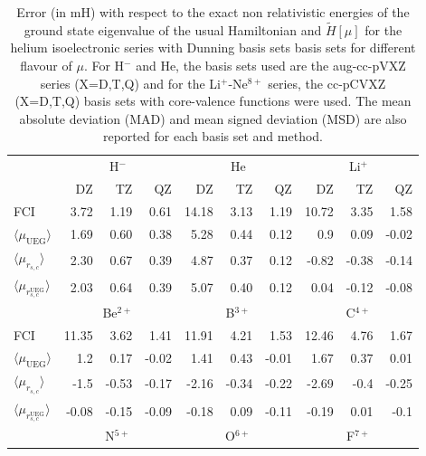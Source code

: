 \documentclass[aip,jcp,reprint,noshowkeys,superscriptaddress]{revtex4-1}
\newcommand{\muueg}{\langle \mu_{\text{UEG}}\rangle}
\newcommand{\mursc}{\langle \mu_{r_{s,c}}\rangle}
\newcommand{\mursclda}{\langle \mu_{r_{s,c}^{\text{UEG}}}\rangle}
\begin{document}
\begin{table}
\label{table_conv_e_mu}
\caption{Error (in mH) with respect to the exact non relativistic energies of the ground state eigenvalue of the usual Hamiltonian and $\tilde{H}[\mu]$ for the helium isoelectronic series with Dunning basis sets basis sets for different flavour of $\mu$. For H$^{-}$ and He, the basis sets used are the aug-cc-pVXZ series (X=D,T,Q) and for the Li$^+$-Ne$^{8+}$ series, the cc-pCVXZ (X=D,T,Q) basis sets with core-valence functions were used. The mean absolute deviation (MAD) and mean signed deviation (MSD) are also reported for each basis set and method. }
\begin{ruledtabular}
\begin{tabular}{l|rrr||rrr||rrr|}
             &\multicolumn{3}{c}{H$^-$}      & \multicolumn{3}{c}{He}       & \multicolumn{3}{c}{Li$^+$}    \\
             &   DZ    &  TZ      &   QZ     &  DZ     &   TZ     &  QZ     &   DZ    &   TZ     &  QZ      \\                   
\hline
 FCI         &   3.72  &    1.19  &   0.61   &  14.18  &   3.13   &  1.19   &  10.72  &   3.35   &  1.58    \\      
$\muueg$     &   1.69  &    0.60  &   0.38   &  5.28   &   0.44   &  0.12   &  0.9    &   0.09   & -0.02    \\      
$\mursc$     &   2.30  &    0.67  &   0.39   &  4.87   &   0.37   &  0.12   &  -0.82  &  -0.38   & -0.14    \\      
$\mursclda$  &   2.03  &    0.64  &   0.39   &  5.07   &   0.40   &  0.12   &  0.04   &  -0.12   & -0.08    \\      
\hline
             &\multicolumn{3}{c}{Be$^{2+}$}  & \multicolumn{3}{c}{B$^{3+}$} & \multicolumn{3}{c}{C$^{4+}$}    \\
 FCI         &  11.35  &   3.62   &  1.41    &  11.91  &   4.21   &  1.53   &  12.46  &   4.76   &  1.67    \\  
$\muueg$     &  1.2    &   0.17   & -0.02    &  1.41   &   0.43   &  -0.01  &  1.67   &   0.37   &  0.01    \\  
$\mursc$     &  -1.5   &  -0.53   & -0.17    &  -2.16  &  -0.34   &  -0.22  &  -2.69  &  -0.4    & -0.25    \\  
$\mursclda$  &  -0.08  &  -0.15   & -0.09    &  -0.18  &   0.09   &  -0.11  &  -0.19  &   0.01   &  -0.1    \\  
\hline
             &\multicolumn{3}{c}{N$^{5+}$}   & \multicolumn{3}{c}{O$^{6+}$} & \multicolumn{3}{c}{F$^{7+}$}    \\

\end{tabular}
\end{ruledtabular}
\end{table}
\end{document}
